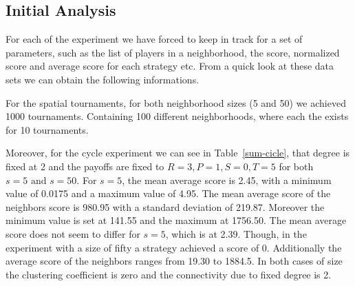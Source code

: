 
\subsection{Initial Analysis}

For each of the experiment we have forced to keep in track for a set of parameters,
such as the list of players in a neighborhood, the score, normalized score and
average score for each strategy etc. From a quick look at these data sets
we can obtain the following informations.

For the spatial tournaments, for both neighborhood sizes (5 and 50)
we achieved 1000 tournaments. Containing 100 different neighborhoods, where each
the exists for 10 tournaments.

Moreover, for the cycle experiment we can see in Table~\ref{sum-cicle}, that degree is
fixed at 2 and the payoffs are fixed to \(R=3, P=1, S=0, T=5\) for both
\( s=5\textrm{ and } s=50 \). For \(s=5\), the mean average score
is 2.45, with a minimum value of 0.0175 and a maximum value of 4.95. The
mean average score of the neighbors score is 980.95 with a standard deviation
of 219.87. Moreover the minimum value is set at 141.55 and the maximum at
1756.50. The mean average score does not seem to differ for \(s=5\),
which is at 2.39. Though, in the experiment with a size of fifty a strategy
achieved a score of 0. Additionally the average score of the neighbors ranges
from 19.30 to 1884.5. In both cases of size the clustering coefficient is zero
and the connectivity due to fixed degree is 2.

